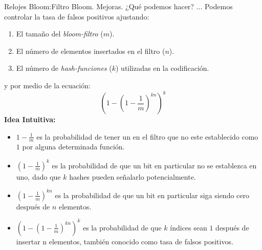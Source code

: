 \begin{frame}[fragile]{Relojes Bloom:}{Filtro Bloom. Mejoras.}
  \justifying
  ¿Qué podemos hacer? ...\newline
  Podemos controlar la tasa de falsos positivos ajustando:
  \begin{enumerate}
  \item El tamaño del \textit{bloom-filtro} ($m$).
  \item El número de elementos insertados en el filtro ($n$).
  \item El número de \textit{hash-funciones} ($k$) utilizadas en la codificación.
  \end{enumerate}
  y por medio de la ecuación:
  \[\left(1 - \left(1 - \frac{1}{m}\right)^{kn}\right)^k\]
  \textbf{Idea Intuitiva:}
  \begin{itemize}
  \item $1 - \frac{1}{m}$ es la probabilidad de tener un  en
    el filtro que no este establecido como $1$ por alguna determinada
    función.
  \item $\left(1 - \frac{1}{m}\right)^k$ es la probabilidad de que un bit
    en particular no se establezca en uno, dado que $k$ hashes pueden
    señalarlo potencialmente.
  \item $\left(1 - \frac{1}{m}\right)^{kn}$ es la probabilidad de que un
    bit en particular siga siendo cero después de $n$ elementos.
  \item $\left(1 - \left(1 - \frac{1}{m}\right)^{kn}\right)^k$ es la probabilidad
    de que $k$ índices sean $1$ después de insertar n elementos, también
    conocido como tasa de falsos positivos.
  \end{itemize}
\end{frame}
